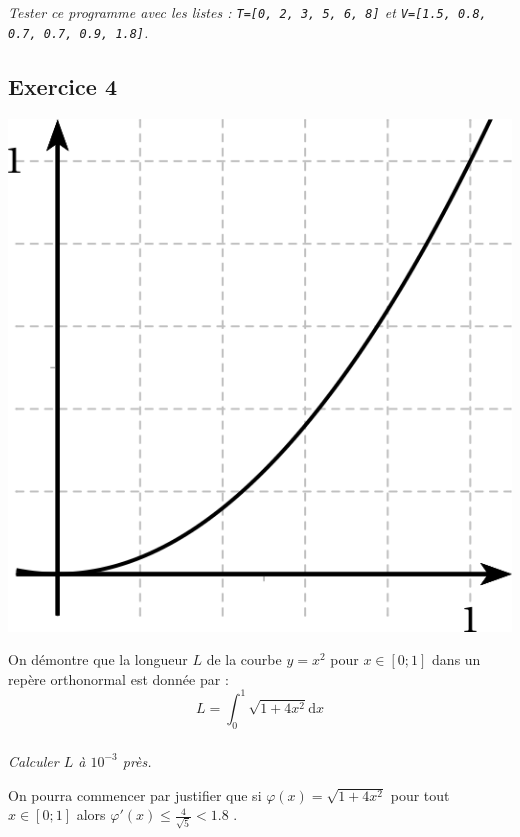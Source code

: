 \documentclass[10pt,oneside]{article}
\begin{document}
\subparagraph{}
\textit{Tester ce programme avec les listes : \texttt{T=[0, 2, 3, 5, 6, 8]} et \texttt{V=[1.5, 0.8, 0.7, 0.7, 0.9, 1.8]}.}


\subsection*{Exercice 4}
\setcounter{subparagraph}{0}


\begin{minipage}{4cm}
\includegraphics[width=\textwidth]{images/courbe}
\end{minipage}
\hfill
\begin{minipage}{12cm}
On démontre que la longueur $L$ de la courbe $y=x^2$ pour $x\in[0;1]$ dans un repère orthonormal est donnée par :
$$L=\int_0^1\sqrt{1+4x^2}\text{d}x$$

\subparagraph*{}\textit{Calculer $L$ à $10^{-3}$ près.}

\medskip

On pourra commencer par justifier que si $\varphi(x)=\sqrt{1+4x^2}$ pour tout $x\in[0;1]$ alors $\varphi'(x)\leq\frac{4}{\sqrt{5}}<1.8$ .
\end{minipage}\hfill\hbox{}
\end{document}
